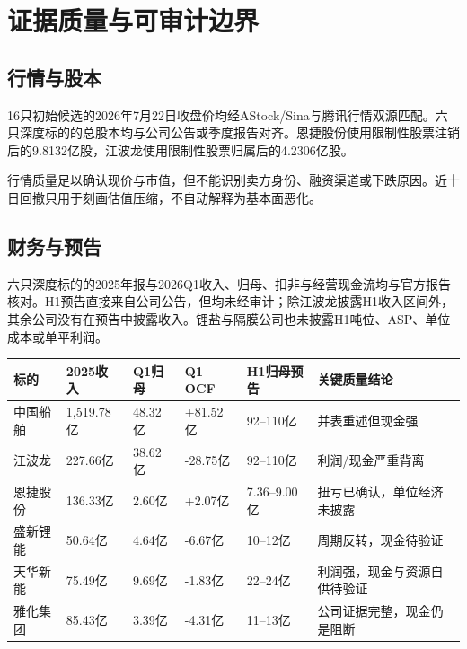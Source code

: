 \chapter{证据质量与可审计边界}

\section{行情与股本}

16只初始候选的2026年7月22日收盘价均经AStock/Sina与腾讯行情双源匹配。六只深度标的的总股本均与公司公告或季度报告对齐。恩捷股份使用限制性股票注销后的9.8132亿股，江波龙使用限制性股票归属后的4.2306亿股。

行情质量足以确认现价与市值，但不能识别卖方身份、融资渠道或下跌原因。近十日回撤只用于刻画估值压缩，不自动解释为基本面恶化。

\section{财务与预告}

六只深度标的的2025年报与2026Q1收入、归母、扣非与经营现金流均与官方报告核对。H1预告直接来自公司公告，但均未经审计；除江波龙披露H1收入区间外，其余公司没有在预告中披露收入。锂盐与隔膜公司也未披露H1吨位、ASP、单位成本或单平利润。

\begin{exhibitbox}
\small
\begin{tabularx}{\exhibitboxwidth}{L{2.4cm} R{1.7cm} R{1.7cm} R{1.7cm} R{1.7cm} X}
\toprule
标的 & 2025收入 & Q1归母 & Q1 OCF & H1归母预告 & 关键质量结论 \\
\midrule
中国船舶 & 1,519.78亿 & 48.32亿 & +81.52亿 & 92--110亿 & 并表重述但现金强 \\
江波龙 & 227.66亿 & 38.62亿 & -28.75亿 & 92--110亿 & 利润/现金严重背离 \\
恩捷股份 & 136.33亿 & 2.60亿 & +2.07亿 & 7.36--9.00亿 & 扭亏已确认，单位经济未披露 \\
盛新锂能 & 50.64亿 & 4.64亿 & -6.67亿 & 10--12亿 & 周期反转，现金待验证 \\
天华新能 & 75.49亿 & 9.69亿 & -1.83亿 & 22--24亿 & 利润强，现金与资源自供待验证 \\
雅化集团 & 85.43亿 & 3.39亿 & -4.31亿 & 11--13亿 & 公司证据完整，现金仍是阻断 \\
\bottomrule
\end{tabularx}
\end{exhibitbox}

